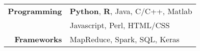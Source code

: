 
\tabcolsep=0.11cm
\begin{tabular}{rl}
  \textbf{Programming} & {\bf Python}, {\bf R}, Java, C/C++, Matlab \\
                      & Javascript, Perl, HTML/CSS\\
  \textbf{Frameworks} & MapReduce, Spark, SQL, Keras \\
\end{tabular}


